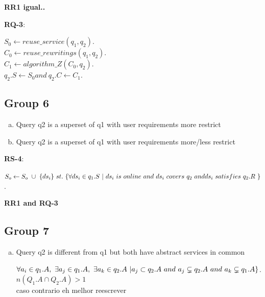\textbf{RR1 igual..}

\begin{definition}
\textbf{RQ-3}:
\begin{flushleft}
$ S_{0} \leftarrow reuse\_service (q_{1}, q_{2})$. \\
$ C_{0} \leftarrow reuse\_rewritings (q_{1}, q_{2})$. \\
$ C_{1} \leftarrow algorithm\_Z (C_{0}, q_{2})$. \\
$ q_{2}.S \leftarrow S_{0} and\ q_{2}.C \leftarrow C_{1}$.
\end{flushleft}
\end{definition}

\subsection{Group 6}
\begin{enumerate}[a)]
\item Query q2 is a superset of q1 with user requirements more restrict
\item Query q2 is a superset of q1 with user requirements more/less restrict
\end{enumerate}

\begin{definition}
\textbf{RS-4}:
\begin{flushleft}
$ S_{o} \leftarrow S_{o} \ \cup \ \lbrace ds_{i} \rbrace\  st.\ \lbrace \forall ds_{i} \in q_{1}.S\ \vert \ ds_{i} \ is \ online\ and\ ds_{i}\ covers\ q_{2}\ and\ \newline ds_{i}\ satisfies\ q_{2}.R\ \rbrace$. \\
\end{flushleft}

\textbf{RR1 and RQ-3}
\end{definition}


\subsection{Group 7}
\begin{enumerate}[a)]
\item Query q2 is different from q1 but both have abstract services in common

\begin{definition}
$ \forall a_{i} \in q_{1}.A,\ \exists a_{j} \in  q_{1}.A,\ \exists a_{k} \in  q_{2}.A\ \vert \newline  
a_{j} \subset  q_{2}.A\ and\ 
a_{j} \subsetneq  q_{2}.A\ and\
a_{k} \subsetneq  q_{1}.A \rbrace$. \\
$n(Q_{1}.A \cap Q_{2}.A) > 1$ \\
caso contrario eh melhor reescrever
\end{definition}
\end{enumerate}

